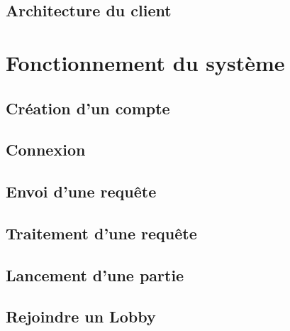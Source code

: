 \documentclass{article}
\begin{document}
\subsection{Architecture du client}

\section{Fonctionnement du système}

\subsection{Création d'un compte}

\subsection{Connexion}

\subsection{Envoi d'une requête}

\subsection{Traitement d'une requête}

\subsection{Lancement d'une partie}

\subsection{Rejoindre un Lobby}
\end{document}
